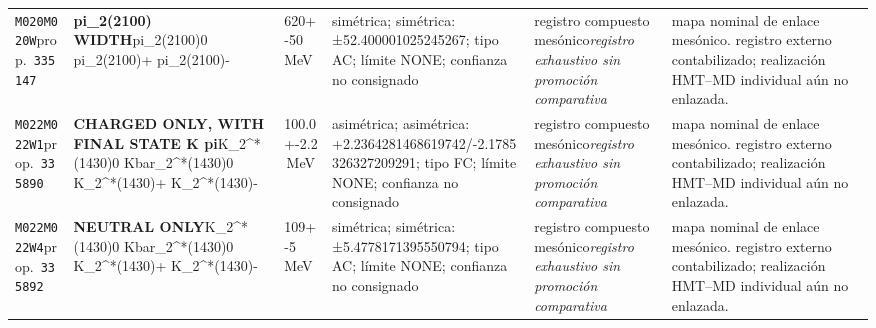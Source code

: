 \begin{landscape}
\begin{longtable}{L{1.85cm}L{4.45cm}L{2.35cm}L{4.05cm}L{3.35cm}L{7.15cm}}
\texttt{M020}\newline \texttt{M020W}\newline prop.\ \texttt{335147} & \textbf{pi\_\allowbreak{}2(2100) WIDTH}\newline pi\_\allowbreak{}2(2100)0 \textbar{}\allowbreak{} pi\_\allowbreak{}2(2100)+ \textbar{}\allowbreak{} pi\_\allowbreak{}2(2100)- & 620+-50\,MeV & simétrica; simétrica: ±52.400001025245267; tipo AC; límite NONE; confianza no consignado & registro compuesto mesónico\newline \emph{registro exhaustivo sin promoción comparativa} & mapa nominal de enlace mesónico. registro externo contabilizado; realización HMT--MD individual aún no enlazada. \\
\texttt{M022}\newline \texttt{M022W1}\newline prop.\ \texttt{335890} & \textbf{CHARGED ONLY, WITH FINAL STATE K pi}\newline K\_\allowbreak{}2\textasciicircum{}*(1430)0 \textbar{}\allowbreak{} Kbar\_\allowbreak{}2\textasciicircum{}*(1430)0 \textbar{}\allowbreak{} K\_\allowbreak{}2\textasciicircum{}*(1430)+ \textbar{}\allowbreak{} K\_\allowbreak{}2\textasciicircum{}*(1430)- & 100.0+-2.2\,MeV & asimétrica; asimétrica: +2.2364281468619742/-2.1785326327209291; tipo FC; límite NONE; confianza no consignado & registro compuesto mesónico\newline \emph{registro exhaustivo sin promoción comparativa} & mapa nominal de enlace mesónico. registro externo contabilizado; realización HMT--MD individual aún no enlazada. \\
\texttt{M022}\newline \texttt{M022W4}\newline prop.\ \texttt{335892} & \textbf{NEUTRAL ONLY}\newline K\_\allowbreak{}2\textasciicircum{}*(1430)0 \textbar{}\allowbreak{} Kbar\_\allowbreak{}2\textasciicircum{}*(1430)0 \textbar{}\allowbreak{} K\_\allowbreak{}2\textasciicircum{}*(1430)+ \textbar{}\allowbreak{} K\_\allowbreak{}2\textasciicircum{}*(1430)- & 109+-5\,MeV & simétrica; simétrica: ±5.4778171395550794; tipo AC; límite NONE; confianza no consignado & registro compuesto mesónico\newline \emph{registro exhaustivo sin promoción comparativa} & mapa nominal de enlace mesónico. registro externo contabilizado; realización HMT--MD individual aún no enlazada. \\

\end{longtable}
\end{landscape}
